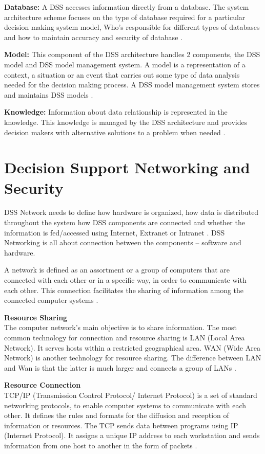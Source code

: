 \textbf{Database: } A DSS accesses information directly from a database. The system architecture scheme focuses on the type of database required for a particular decision making system model, Who’s responsible for different types of databases and how to maintain accuracy and security of database \cite{DSS}.

\textbf{Model: }This component of the DSS architecture handles 2 components, the DSS model and DSS model management system. A model is a representation of a context, a situation or an event that carries out some type of data analysis needed for the decision making process. A DSS model management system stores and maintains DSS models \cite{DSS}.

\textbf{Knowledge: }Information about data relationship is represented in the knowledge. This knowledge is managed by the DSS architecture and provides decision makers with alternative solutions to a problem when needed \cite{DSS}.
\section{Decision Support Networking and Security}
\label{DecisionSupportNetworkingAndSecurity}
DSS Network needs to define how hardware is organized, how data is distributed throughout the system how DSS components are connected and whether the information is fed/accessed using Internet, Extranet or Intranet \cite{DSS}. 
DSS Networking is all about connection between the components – software and hardware.

A network is defined as an assortment or a group of computers that are connected with each other or in a specific way, in order to communicate with each other. This connection facilitates the sharing of information among the connected computer systems \cite{DSS}.

\textbf{Resource Sharing}\\
The computer network's main objective is to share information. The most common technology for connection and resource sharing is LAN (Local Area Network). It serves hosts within a restricted geographical area. WAN (Wide Area Network) is another technology for resource sharing. The difference between LAN and Wan is that the latter is much larger and connects a group of LANs \cite{DSS}.

\textbf{Resource Connection}\\
TCP/IP (Transmission Control Protocol/ Internet Protocol) is a set of standard networking protocols, to enable computer systems to communicate with each other. It defines the rules and formats for the diffusion and reception of information or resources. The TCP sends data between programs using IP (Internet Protocol). It assigns a unique IP address to each workstation and sends information from one host to another in the form of packets \cite{DSS}.

